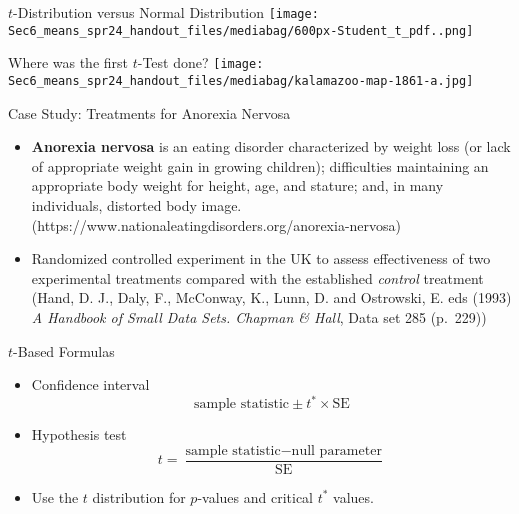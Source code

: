 \documentclass[
  ignorenonframetext,
  aspectratio=32,
]{beamer}
\begin{document}
\begin{frame}{\(t\)-Distribution versus Normal Distribution}
\protect\hypertarget{t-distribution-versus-normal-distribution}{}
\texttt{[image: Sec6\_means\_spr24\_handout\_files/mediabag/600px-Student\_t\_pdf..png]}
\end{frame}

\begin{frame}{Where was the first \(t\)-Test done?}
\protect\hypertarget{where-was-the-first-t-test-done}{}
\texttt{[image: Sec6\_means\_spr24\_handout\_files/mediabag/kalamazoo-map-1861-a.jpg]}
\end{frame}

\begin{frame}{Case Study: Treatments for Anorexia Nervosa}
\protect\hypertarget{case-study-treatments-for-anorexia-nervosa}{}
\begin{itemize}
\item
  \textbf{Anorexia nervosa} is an eating disorder characterized by
  weight loss (or lack of appropriate weight gain in growing children);
  difficulties maintaining an appropriate body weight for height, age,
  and stature; and, in many individuals, distorted body image.
  (https://www.nationaleatingdisorders.org/anorexia-nervosa)
\item
  Randomized controlled experiment in the UK to assess effectiveness of
  two experimental treatments compared with the established
  \emph{control} treatment (Hand, D. J., Daly, F., McConway, K., Lunn,
  D. and Ostrowski, E. eds (1993) \emph{A Handbook of Small Data Sets.
  Chapman \& Hall}, Data set 285 (p.~229))
\end{itemize}
\end{frame}

\begin{frame}{\(t\)-Based Formulas}
\protect\hypertarget{t-based-formulas}{}
\begin{itemize}
\item
  Confidence interval\\
  \[
  \mbox{sample statistic} \pm t^* \times \mbox{SE}
  \]
\item
  Hypothesis test\\
  \[
   t=\frac{\mbox{sample statistic}-\mbox{null parameter}}{\mbox{SE}}
  \]
\item
  Use the \(t\) distribution for \(p\)-values and critical \(t^*\)
  values.
\end{itemize}
\end{frame}
\end{document}
